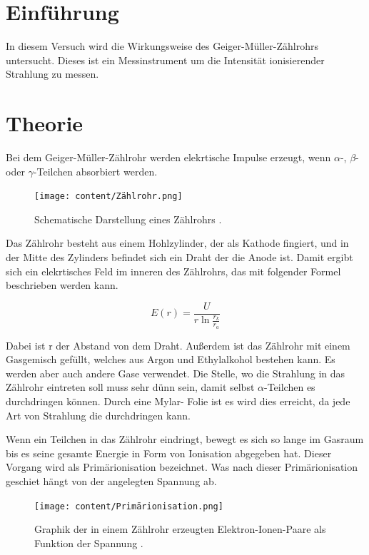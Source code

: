 \section{Einführung}
In diesem Versuch wird die Wirkungsweise des Geiger-Müller-Zählrohrs untersucht.
Dieses ist ein Messinstrument um die Intensität ionisierender Strahlung zu messen.

\section{Theorie}

Bei dem Geiger-Müller-Zählrohr werden elekrtische Impulse erzeugt, wenn $\alpha$-,
$\beta$- oder $\gamma$-Teilchen absorbiert werden.

\begin{figure}[H]
  \centering
  \texttt{[image: content/Zählrohr.png]}
  \caption{Schematische Darstellung eines Zählrohrs \cite{1}.}
  \label{abb:1}
\end{figure}

Das Zählrohr besteht aus einem Hohlzylinder, der als Kathode fingiert, und in der
Mitte des Zylinders befindet sich ein Draht der die Anode ist. Damit ergibt sich
ein elekrtisches Feld im inneren des Zählrohrs, das mit folgender Formel beschrieben
werden kann.

\begin{equation}
  E(r) = \frac{U}{r \ln{\frac{r_k}{r_a}}}
  \label{eq:1}
\end{equation}

Dabei ist r der Abstand von dem Draht. Außerdem ist das Zählrohr mit einem Gasgemisch
gefüllt, welches aus Argon und Ethylalkohol bestehen kann. Es werden aber auch andere
Gase verwendet. Die Stelle, wo die Strahlung in das Zählrohr eintreten soll muss sehr
dünn sein, damit selbst $\alpha$-Teilchen es durchdringen können. Durch eine Mylar-
Folie ist es wird dies erreicht, da jede Art von Strahlung die durchdringen kann.

Wenn ein Teilchen in das Zählrohr eindringt, bewegt es sich so lange im Gasraum bis
es seine gesamte Energie in Form von Ionisation abgegeben hat. Dieser Vorgang wird als
Primärionisation bezeichnet. Was nach dieser Primärionisation geschiet hängt von der
angelegten Spannung ab.

\begin{figure}[H]
  \centering
  \texttt{[image: content/Primärionisation.png]}
  \caption{Graphik der in einem Zählrohr erzeugten Elektron-Ionen-Paare als Funktion
  der Spannung \cite{1}.}
  \label{abb:2}
\end{figure}

